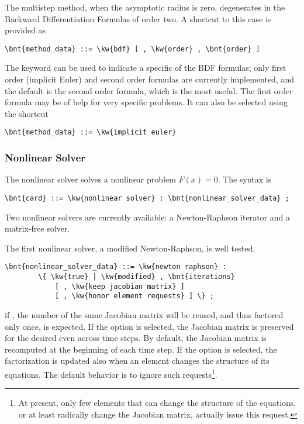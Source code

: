 \noindent
The multistep method, when the asymptotic radius is zero, degenerates
in the Backward Differentiation Formulas of order two.
A shortcut to this case is provided as
\begin{Verbatim}[commandchars=\\\{\}]
    \bnt{method_data} ::= \kw{bdf} [ , \kw{order} , \bnt{order} ]
\end{Verbatim}
The keyword  can be used to indicate a specific 
of the BDF formulas; only first order (implicit Euler) and 
second order formulas are currently implemented, and the default
is the second order formula, which is the most useful.
The first order formula may be of help for very specific problems.
It can also be selected using the shortcut
\begin{Verbatim}[commandchars=\\\{\}]
    \bnt{method_data} ::= \kw{implicit euler}
\end{Verbatim}

\subsubsection{Nonlinear Solver}
The nonlinear solver solves a nonlinear problem $F(x)=0$.
The syntax is
\begin{Verbatim}[commandchars=\\\{\}]
    \bnt{card} ::= \kw{nonlinear solver} : \bnt{nonlinear_solver_data} ;
\end{Verbatim}
Two nonlinear solvers are currently available:
a Newton-Raphson iterator and a matrix-free solver.

The first nonlinear solver, a modified Newton-Raphson, 
is well tested.
\begin{Verbatim}[commandchars=\\\{\}]
    \bnt{nonlinear_solver_data} ::= \kw{newton raphson} :
        \{ \kw{true} | \kw{modified} , \bnt{iterations}
            [ , \kw{keep jacobian matrix} ]
            [ , \kw{honor element requests} ] \} ;
\end{Verbatim}
if , the number of  the same Jacobian matrix 
will be reused, and thus factored only once, is expected.
If the option  is selected,
the Jacobian matrix is preserved
for the desired  even across time steps.
By default, the Jacobian matrix is recomputed at the beginning 
of each time step.
If the option  is selected, the factorization
is updated also when an element changes the structure of its equations.
The default behavior is to ignore such requests\footnote{
	At present, only few elements that can change the structure
	of the equations, or at least radically change the Jacobian matrix,
	actually issue this request.
}.

